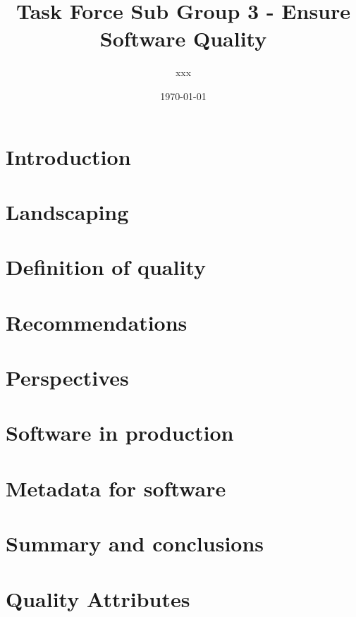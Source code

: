 \documentclass[a4paper]{article}
\title{Task Force Sub Group 3 - Ensure Software Quality}
\author{xxx}
\date{\today}
\begin{document}
\maketitle

\tableofcontents

\newpage
\section{Introduction}


\newpage
\section{Landscaping}


\section{Definition of quality}


\newpage
\section{Recommendations}


\newpage
\section{Perspectives}


\newpage
\section{Software in production}


\newpage
\section{Metadata for software}


\newpage
\section{Summary and conclusions}


\appendix

\newpage
\section{Quality Attributes}


\newpage
\printbibliography
\end{document}
